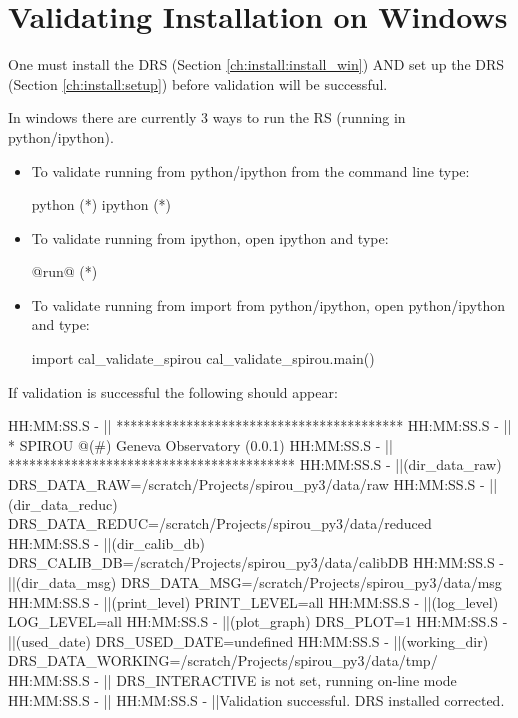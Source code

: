 \clearpage
\newpage
\section{Validating Installation on Windows}
\label{ch:install:validating_installwin}

\begin{note}
One must install the DRS (Section \ref{ch:install:install_win}) AND set up the DRS (Section \ref{ch:install:setup}) before validation will be successful.
\end{note}

\noindent In windows there are currently 3 ways to run the RS (running in python/ipython).

\begin{itemize}
\item To validate running from python/ipython from the command line type:
\begin{cmdbox}
python (*\calvalidate*)
ipython (*\calvalidate*)
\end{cmdbox}

\item To validate running from ipython, open ipython and type:
\begin{pythonbox}
@run@ (*\calvalidate*)
\end{pythonbox}

\item To validate running from import from python/ipython, open python/ipython and type:
\begin{pythonbox}
import cal_validate_spirou
cal_validate_spirou.main()
\end{pythonbox}

\end{itemize}

\noindent If validation is successful the following should appear:
\begin{cmdboxprint}
HH:MM:SS.S -   || *****************************************
HH:MM:SS.S -   || * SPIROU @(#) Geneva Observatory (0.0.1)
HH:MM:SS.S -   || *****************************************
HH:MM:SS.S -   ||(dir_data_raw)      DRS_DATA_RAW=/scratch/Projects/spirou_py3/data/raw
HH:MM:SS.S -   ||(dir_data_reduc)    DRS_DATA_REDUC=/scratch/Projects/spirou_py3/data/reduced
HH:MM:SS.S -   ||(dir_calib_db)      DRS_CALIB_DB=/scratch/Projects/spirou_py3/data/calibDB
HH:MM:SS.S -   ||(dir_data_msg)      DRS_DATA_MSG=/scratch/Projects/spirou_py3/data/msg
HH:MM:SS.S -   ||(print_level)       PRINT_LEVEL=all         %
HH:MM:SS.S -   ||(log_level)         LOG_LEVEL=all         %
HH:MM:SS.S -   ||(plot_graph)        DRS_PLOT=1            %
HH:MM:SS.S -   ||(used_date)         DRS_USED_DATE=undefined
HH:MM:SS.S -   ||(working_dir)       DRS_DATA_WORKING=/scratch/Projects/spirou_py3/data/tmp/
HH:MM:SS.S -   ||                    DRS_INTERACTIVE is not set, running on-line mode
HH:MM:SS.S -   ||
HH:MM:SS.S -   ||Validation successful. DRS installed corrected.
\end{cmdboxprint}